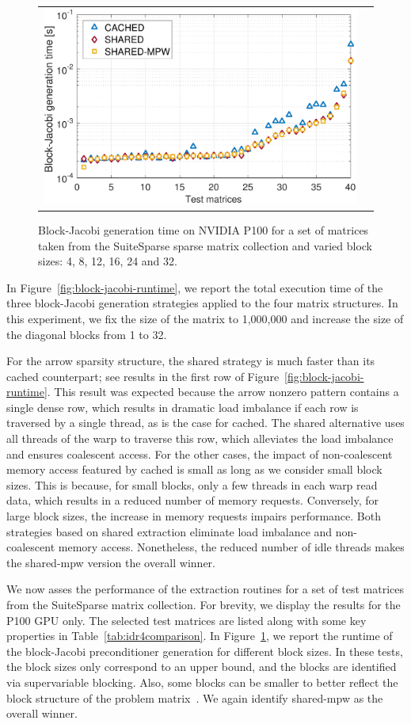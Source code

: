 \begin{figure}
\begin{center}
{\begin{tabular}{cc}
\includegraphics[width=.46\columnwidth]{plots/BJ_generation_time_32.pdf}\\
\end{tabular}
}
\end{center}
\caption{
Block-Jacobi generation time on NVIDIA P100
for a set of matrices taken from the SuiteSparse sparse matrix collection and varied 
block sizes: 4, 8, 12, 16, 24 and 32.
}
\label{fig:block-jacobi-suitsparse}
\end{figure}


In Figure~\ref{fig:block-jacobi-runtime}, we report the total execution time of
the three block-Jacobi generation strategies applied to the four matrix
structures. In this experiment, we fix the size of the matrix to 1,000,000 and
increase the size of the diagonal blocks from 1 to 32.

For the arrow sparsity structure, the {\sc shared} strategy is much faster than
its {\sc cached} counterpart; see results in the first row of
Figure~\ref{fig:block-jacobi-runtime}. This result was expected because the arrow nonzero
pattern contains a single dense row, which results in dramatic load imbalance if
each row is traversed by a single thread, as is the case for {\sc cached}. The
{\sc shared} alternative uses all threads of the warp to traverse this row,
which alleviates the load imbalance and ensures coalescent access. For the other
cases, the impact of non-coalescent memory access featured by {\sc cached} is
small as long as we consider small block sizes. This is because, for small
blocks, only a few threads in each warp read data, which results in a reduced number
of memory requests. Conversely, for large block sizes, the increase in memory
requests impairs performance. Both strategies based on shared extraction
eliminate load imbalance and non-coalescent memory access. Nonetheless, the
reduced number of idle threads makes the {\sc shared-mpw} version the overall
winner.

We now asses the performance of the extraction routines for a set of test
matrices from the SuiteSparse matrix collection. For brevity, we display the
results for the P100 GPU only. The selected test matrices are listed along with
some key properties in Table~\ref{tab:idr4comparison}. In
Figure~\ref{fig:block-jacobi-suitsparse}, we report the runtime of the
block-Jacobi preconditioner generation for different block sizes. In these
tests, the block sizes only correspond to an upper bound, and the blocks are
identified via supervariable blocking. Also, some blocks can be smaller to better
reflect the block structure of the problem matrix~\cite{chow-scott-2016}. We
again identify {\sc shared-mpw} as the overall winner.


